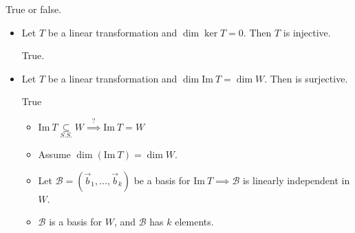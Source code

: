 \documentclass[11pt,fleqn]{book} %
\begin{document}
\begin{example}
    True or false.

    \begin{itemize}
        \item Let $T$ be a linear transformation and $\dim \ker T = 0$. Then $T$ is injective.

        True.

        \item Let $T$ be a linear transformation and $\dim \mathrm{Im}~T = \dim W$. Then  is surjective.

        True
        \begin{itemize}
            \item $\mathrm{Im}~T \underset{S.S.}{\subseteq} W \overset{?}{\implies} \mathrm{Im}~T = W$
            \item Assume $\dim\left( \mathrm{Im}~T \right) = \dim W$.
            \item Let $\mathcal{B} = \left( \vec{b}_1, \dots, \vec{b}_k \right)$ be a basis for $\mathrm{Im}~T \implies \mathcal{B}$ is linearly independent in $W$.
            \item $\mathcal{B}$ is a basis for $W$, and $\mathcal{B}$ has $k$ elements.
        \end{itemize}
    \end{itemize}
\end{example}
\end{document}
